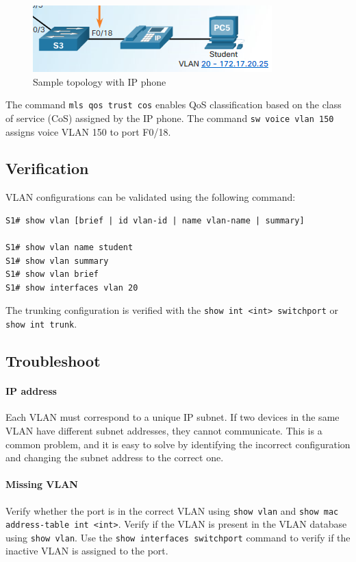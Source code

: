 \begin{figure}[hbtp]
\caption{Sample topology with IP phone}\label{VoiceVLAN}
\centering
\includegraphics[scale=0.6]{pictures/VoiceVLAN.PNG}
\end{figure}

The command \verb|mls qos trust cos| enables QoS classification based on the class of service (CoS) assigned by the IP phone. The command \verb|sw voice vlan 150| assigns  voice VLAN 150 to port F0/18. 

\subsection{Verification}

VLAN configurations can be validated using the following command:

\begin{verbatim}
S1# show vlan [brief | id vlan-id | name vlan-name | summary]

S1# show vlan name student
S1# show vlan summary
S1# show vlan brief
S1# show interfaces vlan 20
\end{verbatim}

The trunking configuration is verified with the \verb|show int <int> switchport| or \verb|show int trunk|.

\subsection{Troubleshoot}

\paragraph{IP address} Each VLAN must correspond to a unique IP subnet. If two devices in the same VLAN have different subnet addresses, they cannot communicate. This is a common problem, and it is easy to solve by identifying the incorrect configuration and changing the subnet address to the correct one.

\paragraph{Missing VLAN} Verify whether the port is in the correct VLAN using \verb|show vlan| and \verb|show mac address-table int <int>|. Verify if the VLAN is present in the VLAN database using \verb|show vlan|. Use the \verb|show interfaces switchport| command to verify if the inactive VLAN is assigned to the port.


